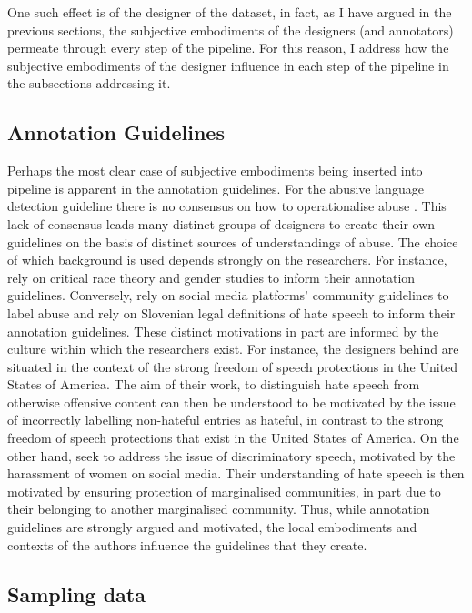 One such effect is of the designer of the dataset, in fact, as I have argued in the previous sections, the subjective embodiments of the designers (and annotators) permeate through every step of the pipeline. For this reason, I address how the subjective embodiments of the designer influence in each step of the pipeline in the subsections addressing it.

\subsection{Annotation Guidelines}

Perhaps the most clear case of subjective embodiments being inserted into pipeline is apparent in the annotation guidelines. For the abusive language detection guideline there is no consensus on how to operationalise abuse \citep{Waseem:2017}. This lack of consensus leads many distinct groups of designers to create their own guidelines on the basis of distinct sources of understandings of abuse. The choice of which background is used depends strongly on the researchers. For instance, \citet{Waseem-Hovy:2016} rely on critical race theory and gender studies to inform their annotation guidelines. Conversely, \citet{Davidson:2017} rely on social media platforms' community guidelines to label abuse and \citet{Fiser:2017} rely on Slovenian legal definitions of hate speech to inform their annotation guidelines. These distinct motivations in part are informed by the culture within which the researchers exist. For instance, the designers behind \citet{Davidson:2017} are situated in the context of the strong freedom of speech protections in the United States of America. The aim of their work, to distinguish hate speech from otherwise offensive content can then be understood to be motivated by the issue of incorrectly labelling non-hateful entries as hateful, in contrast to the strong freedom of speech protections that exist in the United States of America. On the other hand, \citet{Waseem-Hovy:2016} seek to address the issue of discriminatory speech, motivated by the harassment of women on social media. Their understanding of hate speech is then motivated by ensuring protection of marginalised communities, in part due to their belonging to another marginalised community.
Thus, while annotation guidelines are strongly argued and motivated, the local embodiments and contexts of the authors influence the guidelines that they create.

\subsection{Sampling data}

